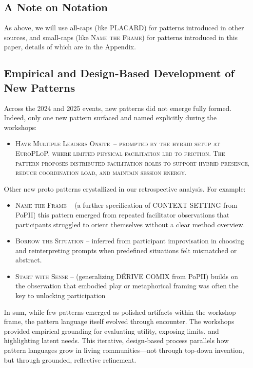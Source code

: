 \documentclass[acmlarge,timestamp]{acmart}
\providecommand{\tightlist}{%
  \setlength{\itemsep}{0pt}\setlength{\parskip}{0pt}}
\begin{document}
\subsection{A Note on Notation}
As above, we will use all-caps (like PLACARD) for patterns introduced in other sources, and small-caps (like {\scshape{Name the Frame}}) for patterns introduced in this paper, details of which are in the Appendix.

\subsection{Empirical and Design-Based Development of New Patterns}

Across the 2024 and 2025 events, new patterns did not emerge fully
formed.  Indeed, only one new pattern surfaced and named explicitly
during the workshops:

\begin{itemize}
\tightlist
\item[]
  \scshape{Have Multiple Leaders Onsite}{~-- prompted by the hybrid setup at
  EuroPLoP, where limited physical facilitation led to friction. The
  pattern proposes distributed facilitation roles to support hybrid
  presence, reduce coordination load, and maintain session energy.}
\end{itemize}

Other new proto patterns crystallized in our retrospective analysis.
For example:

\begin{itemize}
\tightlist
\item[]
  {\scshape{Name the Frame}} -- (a further specification of
  CONTEXT SETTING from PoPII) this pattern emerged from repeated
  facilitator observations that participants struggled to orient
  themselves without a clear method overview.
\item[]
  {\scshape{Borrow the Situation}} -- inferred from participant improvisation in choosing and reinterpreting prompts when predefined situations felt mismatched or abstract.
\item[]
  {\scshape{Start with Sense}} -- (generalizing {D\'ERIVE COMIX} from PoPII)
    builds on the observation that embodied play or metaphorical
    framing was often the key to unlocking participation
\end{itemize}

{In sum, while few patterns emerged as polished artifacts within the
workshop frame, the pattern language itself evolved through encounter.
The workshops provided empirical grounding for evaluating utility,
exposing limits, and highlighting latent needs. This iterative,
design-based process parallels how pattern languages grow in living
communities---not through top-down invention, but through grounded,
reflective refinement.}
\end{document}
